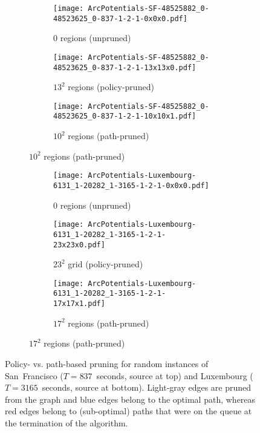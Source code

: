 \documentclass[oribibl]{llncs}
\begin{document}
			\begin{figure}[H]
				\centering
				\begin{subfigure}{\textwidth}
					\centering
					\begin{subfigure}{0.32\textwidth}
						\centering
						\texttt{[image: ArcPotentials-SF-48525882\_0-48523625\_0-837-1-2-1-0x0x0.pdf]}
						\caption*{$0$ regions (unpruned)}
					\end{subfigure}
					\begin{subfigure}{0.32\textwidth}
						\centering
						\texttt{[image: ArcPotentials-SF-48525882\_0-48523625\_0-837-1-2-1-13x13x0.pdf]}
						\caption*{$13^2$ regions (policy-pruned)}
					\end{subfigure}
					\begin{subfigure}{0.32\textwidth}
						\centering
						\texttt{[image: ArcPotentials-SF-48525882\_0-48523625\_0-837-1-2-1-10x10x1.pdf]}
						\caption*{$10^2$ regions (path-pruned)}
					\end{subfigure}
				\end{subfigure}
				\begin{subfigure}{\textwidth}
					\centering
					\begin{subfigure}{0.32\textwidth}
						\centering
						\texttt{[image: ArcPotentials-Luxembourg-6131\_1-20282\_1-3165-1-2-1-0x0x0.pdf]}
						\caption*{$0$ regions (unpruned)}
					\end{subfigure}
					\begin{subfigure}{0.32\textwidth}
						\centering
						\texttt{[image: ArcPotentials-Luxembourg-6131\_1-20282\_1-3165-1-2-1-23x23x0.pdf]}
						\caption*{$23^2$ grid (policy-pruned)}
					\end{subfigure}
					\begin{subfigure}{0.32\textwidth}
						\centering
						\texttt{[image: ArcPotentials-Luxembourg-6131\_1-20282\_1-3165-1-2-1-17x17x1.pdf]}
						\caption*{$17^2$ regions (path-pruned)}
					\end{subfigure}
				\end{subfigure}
				\caption
				{
					Policy- vs. path-based pruning for random instances of
					San~Francisco ($T = 837$~seconds, source at top)
					and Luxembourg ($T = 3165$~seconds, source at bottom).
					Light-gray edges are pruned from the graph and blue edges belong to the optimal
					path, whereas red edges belong to (sub-optimal) paths that were on the queue
					at the termination of the algorithm.
				}
				\label{fig:Path}
			\end{figure}
\end{document}
